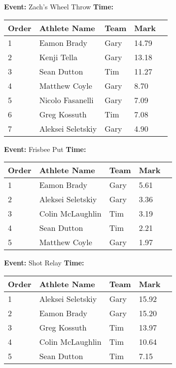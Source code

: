 \documentclass[10pt]{article}
\begin{document}
\textbf{Event:} Zach's Wheel Throw \quad \textbf{Time:}  

\vspace{1em}
\begin{tabular}{@{}lllll@{}}
\toprule

\textbf{Order} & \textbf{Athlete Name} & \textbf{Team} & \textbf{Mark} \\
\midrule
1 & Eamon Brady & Gary & 14.79 &\\
2 & Kenji Tella & Gary & 13.18 &\\
3 & Sean Dutton & Tim & 11.27 &\\
4 & Matthew Coyle & Gary & 8.70 &\\
5 & Nicolo Fasanelli & Gary & 7.09 &\\
6 & Greg Kossuth & Tim & 7.08 &\\
7 & Aleksei Seletskiy & Gary & 4.90 &\\
\bottomrule
\end{tabular}
\vspace{2.5em}


\textbf{Event:} Frisbee Put \quad \textbf{Time:}  

\vspace{1em}
\begin{tabular}{@{}lllll@{}}
\toprule

\textbf{Order} & \textbf{Athlete Name} & \textbf{Team} & \textbf{Mark} \\
\midrule
1 & Eamon Brady & Gary & 5.61 &\\
2 & Aleksei Seletskiy & Gary & 3.36 &\\
3 & Colin McLaughlin & Tim & 3.19 &\\
4 & Sean Dutton & Tim & 2.21 &\\
5 & Matthew Coyle & Gary & 1.97 &\\
\bottomrule
\end{tabular}
\vspace{2.5em}


\textbf{Event:} Shot Relay \quad \textbf{Time:}  

\vspace{1em}
\begin{tabular}{@{}lllll@{}}
\toprule

\textbf{Order} & \textbf{Athlete Name} & \textbf{Team} & \textbf{Mark} \\
\midrule
1 & Aleksei Seletskiy & Gary & 15.92 &\\
2 & Eamon Brady & Gary & 15.20 &\\
3 & Greg Kossuth & Tim & 13.97 &\\
4 & Colin McLaughlin & Tim & 10.64 &\\
5 & Sean Dutton & Tim & 7.15 &\\
\bottomrule
\end{tabular}
\vspace{2.5em}
\end{document}
